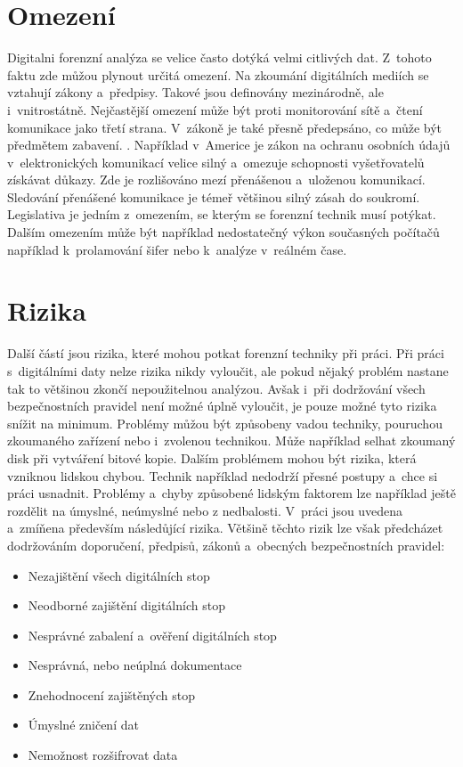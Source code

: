 \documentclass[thesis=B,czech]{FITthesis}[2012/06/26]
\begin{document}
\section{Omezení}

Digitalni forenzní analýza se velice často dotýká velmi citlivých dat. Z~tohoto faktu zde můžou plynout určitá omezení. Na zkoumání  digitálních mediích se vztahují zákony a~předpisy. Takové jsou definovány mezinárodně, ale i~vnitrostátně. Nejčastější omezení může být proti monitorování sítě a~čtení komunikace jako třetí strana. V~zákoně je také přesně předepsáno, co může být předmětem zabavení. \cite{for_wi}. Například v~Americe je zákon na ochranu osobních údajů v~elektronických komunikací velice silný a~omezuje schopnosti vyšetřovatelů získávat důkazy. Zde je rozlišováno mezí přenášenou a~uloženou komunikací. Sledování přenášené komunikace je témeř většinou silný zásah do soukromí. Legislativa je jedním z~omezením, se kterým se forenzní technik musí potýkat. Dalším omezením může být například nedostatečný výkon současných počítačů například k~prolamování šifer nebo k~analýze v~reálném čase. 


\section{Rizika}
Další částí jsou rizika, které mohou potkat forenzní techniky při práci. Při práci s~digitálními daty nelze rizika nikdy vyloučit, ale pokud nějaký problém nastane tak to většinou zkončí nepoužitelnou analýzou. Avšak i~při dodržování všech bezpečnostních pravidel není možné úplně vyloučit, je pouze možné tyto rizika snížit na minimum. Problémy můžou být způsobeny vadou techniky, pouruchou zkoumaného zařízení nebo i~zvolenou technikou. Může například selhat zkoumaný disk při vytváření bitové kopie. Dalším problémem mohou být rizika, která vzniknou lidskou chybou. Technik například nedodrží přesné postupy a~chce si práci usnadnit. Problémy a~chyby způsobené lidským faktorem lze například ještě rozdělit na úmyslné, neúmyslné nebo z nedbalosti. V~práci \cite{for_baka} jsou uvedena a~zmíňena především následůjící rizika. Většině těchto rizik lze však předcházet dodržováním doporučení, předpisů, zákonů a~obecných bezpečnostních pravidel:

\begin{itemize}
\item Nezajištění všech digitálních stop
\item Neodborné zajištění digitálních stop
\item Nesprávné zabalení a~ověření digitálních stop
\item Nesprávná, nebo neúplná dokumentace
\item Znehodnocení zajištěných stop
\item Úmyslné zničení dat
\item Nemožnost rozšifrovat data

\end{itemize}
\end{document}
